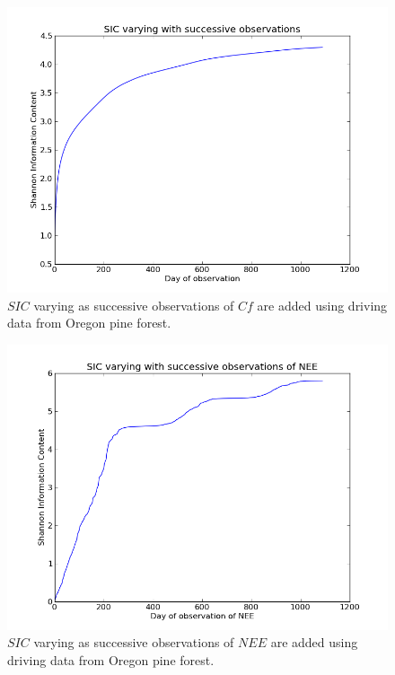 \documentclass[11pt]{article}
\begin{document}
\begin{figure}[h]
\centering
\includegraphics[width=.9\textwidth]{SIC_0_1090Cf.png}
\caption{$SIC$ varying as successive observations of $Cf$ are added using driving data from Oregon pine forest.}
\label{fig:SIC_subplot}
\end{figure}

\begin{figure}[h]
\centering
\includegraphics[width=.9\textwidth]{SIC_0_1090.png}
\caption{$SIC$ varying as successive observations of $NEE$ are added using driving data from Oregon pine forest.}
\label{fig:SIC_subplot}
\end{figure} 
\end{document}
